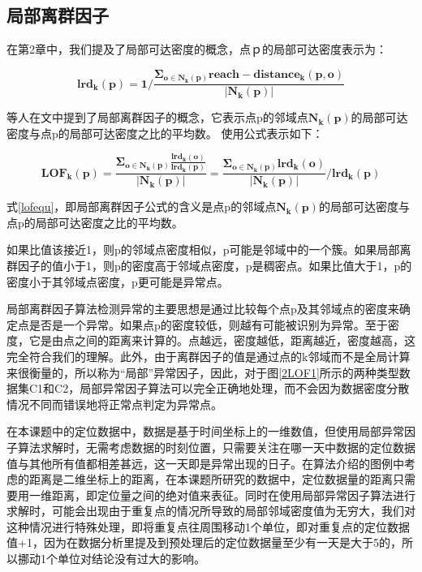 \documentclass[a4paper,AutoFakeBold,oneside,12pt]{book}
\begin{document}
\subsection{局部离群因子}

	在第2章中，我们提及了局部可达密度的概念，点ｐ的局部可达密度表示为：

	\begin{equation}
	\bm{lrd_k(p)}=\bm{1}/\frac{\bm{\Sigma_{o\in N_k(p)} reach-distance_k(p,o)}}{\bm{|N_k(p)|}}
	\end{equation}

	等人在文中提到了局部离群因子的概念，它表示点p的邻域点$\bm{N_k(p)}$的局部可达密度与点p的局部可达密度之比的平均数。 使用公式表示如下：

	\begin{equation}
	\label{lofequ}
	\bm{LOF_k(p)}=\frac{\bm{\Sigma_{o\in N_k(p)} \frac{lrd_k(o)}{lrd_k(p)}}}{\bm{|N_k(p)|}}=\frac{\bm{\Sigma_{o\in N_k(p)} lrd_k(o)}}{\bm{|N_k(p)|}}/\bm{lrd_k(p)}
	\end{equation}

	式\ref{lofequ}，即局部离群因子公式的含义是点p的邻域点$\bm{N_k(p)}$的局部可达密度与点p的局部可达密度之比的平均数。

	如果比值该接近1，则p的邻域点密度相似，p可能是邻域中的一个簇。如果局部离群因子的值小于1，则p的密度高于邻域点密度，p是稠密点。如果比值大于1，p的密度小于其邻域点密度，p更可能是异常点。

	局部离群因子算法检测异常的主要思想是通过比较每个点p及其邻域点的密度来确定点是否是一个异常。如果点p的密度较低，则越有可能被识别为异常。至于密度，它是由点之间的距离来计算的。点越远，密度越低，距离越近，密度越高，这完全符合我们的理解。此外，由于离群因子的值是通过点的k邻域而不是全局计算来很衡量的，所以称为“局部”异常因子，因此，对于图\ref{2LOF1}所示的两种类型数据集C1和C2，局部异常因子算法可以完全正确地处理，而不会因为数据密度分散情况不同而错误地将正常点判定为异常点。

	在本课题中的定位数据中，数据是基于时间坐标上的一维数值，但使用局部异常因子算法求解时，无需考虑数据的时刻位置，只需要关注在哪一天中数据的定位数据值与其他所有值都相差甚远，这一天即是异常出现的日子。在算法介绍的图例中考虑的距离是二维坐标上的距离，在本课题所研究的数据中，定位数据量的距离只需要用一维距离，即定位量之间的绝对值来表征。同时在使用局部异常因子算法进行求解时，可能会出现由于重复点的情况所导致的局部邻域密度值为无穷大，我们对这种情况进行特殊处理，即将重复点往周围移动1个单位，即对重复点的定位数据值+1，因为在数据分析里提及到预处理后的定位数据量至少有一天是大于5的，所以挪动1个单位对结论没有过大的影响。
\end{document}
